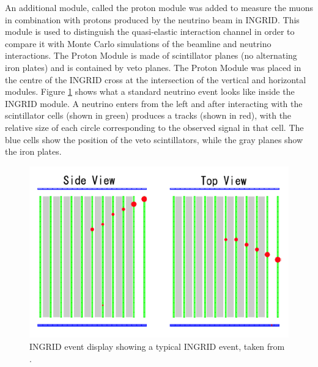 An additional module, called the proton module was added to measure the muons in combination with protons produced by the neutrino beam in INGRID. This module is used to distinguish the quasi-elastic interaction channel in order to compare it with Monte Carlo simulations of the beamline and neutrino interactions. The Proton Module is made of scintillator planes (no alternating iron plates) and is contained by veto planes. The Proton Module was placed in the centre of the INGRID cross at the intersection of the vertical and horizontal modules. Figure \ref{fig:ingridevent} shows what a standard neutrino event looks like inside the INGRID module. A neutrino enters from the left and after interacting with the scintillator cells (shown in green) produces a tracks (shown in red), with the relative size of each circle corresponding to the observed signal in that cell. The blue cells show the position of the veto scintillators, while the gray planes show the iron plates. 

\begin{figure}
    \includegraphics[width=\textwidth]{Figures/ingridevent.png}
    \caption{INGRID event display showing a typical INGRID event, taken from \cite{t2kcollaborationT2KExperiment2011}.}
    \label{fig:ingridevent}
\end{figure}



